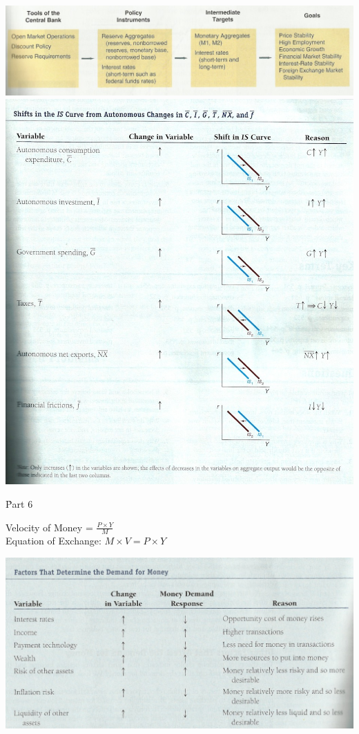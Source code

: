\documentclass[12pt]{examnotes}
\begin{document}
\begin{center}
  \includegraphics[scale=0.5]{./imgs/chap17fig2.jpg}
  \includegraphics[scale=0.5]{./imgs/c21t1.jpg}
\end{center}


\h{Part 6}

Velocity of Money = $\displaystyle\frac{P \times Y}{M}$ \\
Equation of Exchange: $M\times V=P \times Y$
\begin{center}
  \includegraphics[scale=0.5]{./imgs/c20t1.jpg}
\end{center}
\end{document}
